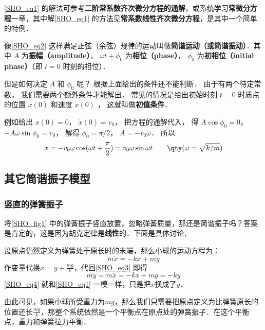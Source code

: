\autoref{SHO_eq1} 的解法可参考\textbf{二阶常系数齐次微分方程的通解}，或系统学习\textbf{常微分方程}一章，其中解\autoref{SHO_eq1} 的方法见\textbf{常系数线性齐次微分方程}，是其中一个简单的特例．

像\autoref{SHO_eq2} 这样满足正弦（余弦）规律的运动叫做\textbf{简谐运动（或简谐振动）}．其中 $A$ 为\textbf{振幅（amplitude）}， $\omega t + \phi_0$ 为\textbf{相位（phase）}， $\phi_0$ 为\textbf{初相位（initial phase）}（即 $t = 0$ 时刻的相位）． 

但是如何决定 $A$ 和 $\phi_0$ 呢？ 根据上面给出的条件还不能判断． 由于有两个待定常数， 我们需要两个额外条件才能解出． 常见的情况是给出初始时刻 $t = 0$ 时质点的位置 $x(0)$ 和速度 $\dot x(0)$ ， 这就叫做\textbf{初值条件}．

例如给出 $x(0) = 0$，  $\dot x(0) = v_0$， 把方程的通解代入， 得 $A\cos \phi_0 = 0$，  $ - A\omega \sin \phi_0 = v_0$， 解得 $\phi_0 = \pi /2$，  $A =  -v_0\omega $． 所以
\begin{equation}
x =  - v_0\omega \cos (\omega t + \frac{\pi }{2}) = v_0\omega \sin \omega t \qquad \qty(\omega  = \sqrt{k/m})
\end{equation}


\subsection{其它简谐振子模型}

\subsubsection{竖直的弹簧振子}

将\autoref{SHO_fig1} 中的弹簧振子竖直放置，忽略弹簧质量，那还是简谐振子吗？答案是肯定的，这是因为胡克定律是\textbf{线性}的．下面是具体讨论．

设原点仍然定义为弹簧处于原长时的末端，那么小球的运动方程为：
\begin{equation}\label{SHO_eq3}
m\ddot{x} = -kx+mg
\end{equation}
作变量代换$x=y+\frac{mg}{k}$，代回\autoref{SHO_eq3} 即得
\begin{equation}\label{SHO_eq4}
m\ddot{y} = m\ddot{x} = -kx+mg = -ky
\end{equation}
\autoref{SHO_eq4} 就和\autoref{SHO_eq1} 一模一样，只是把$x$换成了$y$．

由此可见，如果小球所受重力为$mg$，那么我们只需要把原点定义为比弹簧原长的位置还长$\frac{mg}{k}$，那整个系统依然是一个平衡点在原点处的弹簧振子．在这个平衡点，重力和弹簧拉力平衡．


